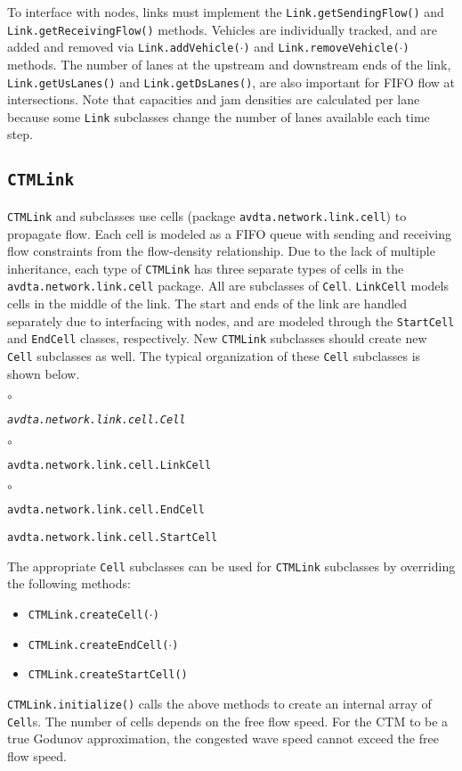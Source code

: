 To interface with nodes, links must implement the \texttt{Link.getSendingFlow()} and \texttt{Link.getReceivingFlow()} methods. Vehicles are individually tracked, and are added and removed via \texttt{Link.addVehicle($\cdot$)} and \texttt{Link.removeVehicle($\cdot$)} methods. The number of lanes at the upstream and downstream ends of the link, \texttt{Link.getUsLanes()} and \texttt{Link.getDsLanes()}, are also important for FIFO flow at intersections. Note that capacities and jam densities are calculated per lane because some \texttt{Link} subclasses change the number of lanes available each time step.

\subsection{\texttt{CTMLink}}

\texttt{CTMLink} and subclasses use cells (package \texttt{avdta.network.link.cell}) to propagate flow. Each cell is modeled as a FIFO queue with sending and receiving flow constraints from the flow-density relationship. Due to the lack of multiple inheritance, each type of \texttt{CTMLink} has three separate types of cells in the \texttt{avdta.network.link.cell} package. All are subclasses of \texttt{Cell}. \texttt{LinkCell} models cells in the middle of the link. The start and ends of the link are handled separately due to interfacing with nodes, and are modeled through the \texttt{StartCell} and \texttt{EndCell} classes, respectively. New \texttt{CTMLink} subclasses should create new \texttt{Cell} subclasses as well. The typical organization of these \texttt{Cell} subclasses is shown below.
\begin{list}{$\circ$}{}
	\item \texttt{\textit{avdta.network.link.cell.Cell}}
	
	\begin{list}{$\circ$}{}
		\item \texttt{avdta.network.link.cell.LinkCell}
		
		\begin{list}{$\circ$}{}
			\item \texttt{avdta.network.link.cell.EndCell}
		\end{list}
		\item \texttt{avdta.network.link.cell.StartCell}
	\end{list}
\end{list}
The appropriate \texttt{Cell} subclasses can be used for \texttt{CTMLink} subclasses by overriding the following methods:
\begin{itemize}
	\item \texttt{CTMLink.createCell($\cdot$)}
	\item \texttt{CTMLink.createEndCell($\cdot$)}
	\item \texttt{CTMLink.createStartCell()}
\end{itemize}
\texttt{CTMLink.initialize()}  calls the above methods to create an internal array of \texttt{Cell}s. The number of cells depends on the free flow speed. For the CTM to be a true Godunov approximation\cite{godunov1959difference}, the congested wave speed cannot exceed the free flow speed.

